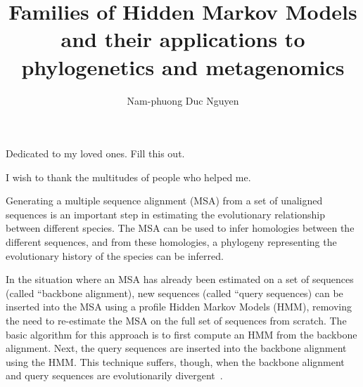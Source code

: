 \documentclass[12pt]{report}	%
\author{Nam-phuong Duc Nguyen}  	%
\title{Families of Hidden Markov Models and their applications to phylogenetics and metagenomics}
\theoremstyle{definition}
\theoremstyle{remark}
\begin{document}
\sloppy
\copyrightpage          %


%
%
%
\commcertpage           %

\titlepage              %



%
\begin{dedication}
%
Dedicated to my loved ones.  Fill this out.
\end{dedication}


\begin{acknowledgments}%
%
I wish to thank the multitudes of people who helped me.   
\end{acknowledgments}



\utabstract
{}%
\indent

Generating a multiple sequence alignment (MSA) from 
a set of unaligned sequences is an important step in
estimating the evolutionary relationship between
different species.  The MSA can be used to infer homologies
between the different sequences, and from these homologies,
a phylogeny representing the evolutionary history of the species can be inferred.

In the situation where an MSA has
already been estimated on a set of sequences (called ``backbone alignment), new sequences (called ``query sequences) can be inserted into the MSA using a profile Hidden Markov Models (HMM), removing the need to re-estimate the MSA on the full set of sequences from scratch.  The basic algorithm for this approach is to first compute an HMM from the backbone alignment.  Next, the query sequences are inserted into the backbone alignment using the HMM.  This technique suffers, though, when the backbone alignment and query sequences are evolutionarily divergent~\cite{Mirarab2012}.  
\end{document}
